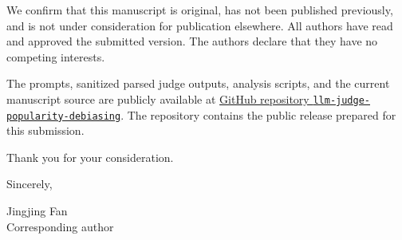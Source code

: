 \documentclass[11pt]{article}
\begin{document}
We confirm that this manuscript is original, has not been published previously, and is not under consideration for publication elsewhere. All authors have read and approved the submitted version. The authors declare that they have no competing interests.

The prompts, sanitized parsed judge outputs, analysis scripts, and the current manuscript source are publicly available at \href{https://github.com/niyaobuyaochibl/llm-judge-popularity-debiasing}{GitHub repository \texttt{llm-judge-popularity-debiasing}}. The repository contains the public release prepared for this submission.

Thank you for your consideration.

Sincerely,

\vspace{1em}

Jingjing Fan\\
Corresponding author
\end{document}
